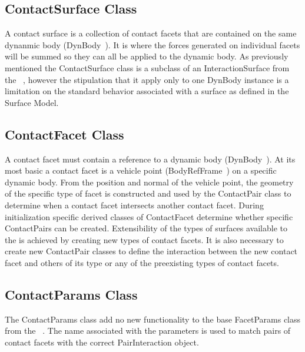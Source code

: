 \subsection{ContactSurface Class}
A contact surface is a collection of contact facets that are contained on the same dynanmic body (DynBody~\cite{dynenv:DYNBODY}). It is where the forces generated on individual facets will be summed so they can all be applied to the dynamic body.  As previously mentioned the ContactSurface class is a subclass of an InteractionSurface from the \SURFACEMODEL~\cite{dynenv:SURFACEMODEL}, however the stipulation that it apply only to one DynBody instance is a limitation on the standard behavior associated with a surface as defined in the Surface Model.

\subsection{ContactFacet Class}
A contact facet must contain a reference to a dynamic body (DynBody~\cite{dynenv:DYNBODY}).  At its most basic a contact facet is a vehicle point (BodyRefFrame~\cite{dynenv:DYNBODY}) on a specific dynamic body.  From the position and normal of the vehicle point, the geometry of the specific type of facet is constructed and used by the ContactPair class to determine when a contact facet intersects another contact facet.  During initialization specific derived classes of ContactFacet determine whether specific ContactPairs can be created. Extensibility of the types of surfaces available to the \ModelDesc is achieved by creating new types of contact facets. It is also necessary to create new ContactPair classes to define the interaction between the new contact facet and others of its type or any of the preexisting types of contact facets.

\subsection{ContactParams Class}
The ContactParams class add no new functionality to the base FacetParams class from the \SURFACEMODEL~\cite{dynenv:SURFACEMODEL}. The name associated with the parameters is used to match pairs of contact facets with the correct PairInteraction object.

